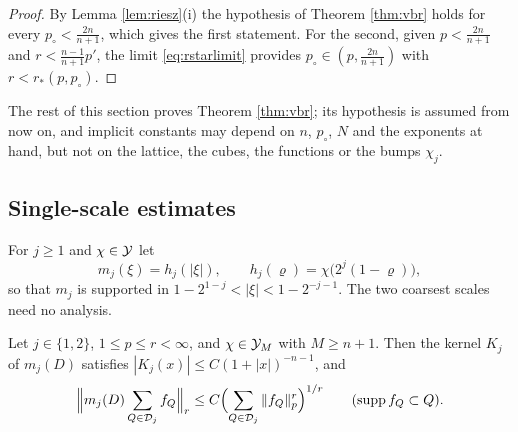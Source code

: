 \begin{proof}
By Lemma \ref{lem:riesz}(i) the hypothesis of Theorem \ref{thm:vbr} holds for every
$p_\circ<\frac{2n}{n+1}$, which gives the first statement. For the second, given $p<\frac{2n}{n+1}$ and
$r<\frac{n-1}{n+1}p'$, the limit \eqref{eq:rstarlimit} provides $p_\circ\in(p,\frac{2n}{n+1})$ with
$r<r_*(p,p_\circ)$.
\end{proof}

The rest of this section proves Theorem \ref{thm:vbr}; its hypothesis is assumed from now on, and
implicit constants may depend on $n$, $p_\circ$, $N$ and the exponents at hand, but not on the
lattice, the cubes, the functions or the bumps $\chi_j$.

\subsection{Single-scale estimates}\label{ssec:singlescale}
For $j\ge1$ and $\chi\in\mathcal Y$ let
\begin{equation}\label{eq:mj}
m_j(\xi)=h_j(|\xi|),\qquad h_j(\varrho)=\chi\bigl(2^j(1-\varrho)\bigr),
\end{equation}
so that $m_j$ is supported in $1-2^{1-j}<|\xi|<1-2^{-j-1}$. The two coarsest scales need no
analysis.

\begin{lemma}\label{lem:twoscales}
Let $j\in\{1,2\}$, $1\le p\le r<\infty$, and $\chi\in\mathcal Y_M$ with $M\ge n+1$. Then the kernel $K_j$ of
$m_j(D)$ satisfies $|K_j(x)|\le C(1+|x|)^{-n-1}$, and
\[
\Bigl\|m_j(D)\sum_{Q\in\mathcal D_j}f_Q\Bigr\|_r\le C\Bigl(\sum_{Q\in\mathcal D_j}\|f_Q\|_p^r\Bigr)^{1/r}
\qquad(\operatorname{supp} f_Q\subset Q).
\]
\end{lemma}

